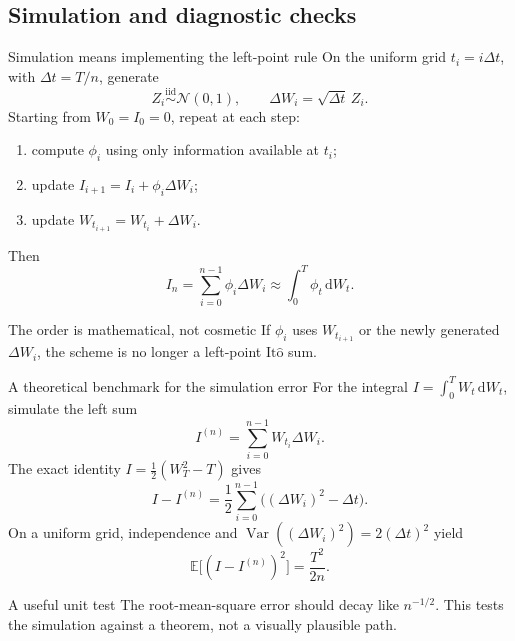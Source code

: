 \documentclass[handout,10pt,aspectratio=169]{beamer}
\newcommand{\E}{\mathbb E}
\newcommand{\dd}{\,\mathrm d}
\newcommand{\Ito}{\mathrm{It\hat{o}}}
\DeclareMathOperator{\Var}{Var}
\begin{document}
\subsection{Simulation and diagnostic checks}

\begin{frame}{Simulation means implementing the left-point rule}
\small
On the uniform grid \(t_i=i\Delta t\), with \(\Delta t=T/n\), generate
\[
Z_i\overset{\mathrm{iid}}{\sim}\mathcal N(0,1),
\qquad
\Delta W_i=\sqrt{\Delta t}\,Z_i.
\]
Starting from \(W_0=I_0=0\), repeat at each step:
\begin{enumerate}\setlength{\itemsep}{0.45em}
  \item compute \(\phi_i\) using only information available at \(t_i\);
  \item update \(I_{i+1}=I_i+\phi_i\Delta W_i\);
  \item update \(W_{t_{i+1}}=W_{t_i}+\Delta W_i\).
\end{enumerate}
Then
\[
I_n=\sum_{i=0}^{n-1}\phi_i\Delta W_i
\approx \int_0^T\phi_t\dd W_t.
\]
\begin{block}{The order is mathematical, not cosmetic}
If \(\phi_i\) uses \(W_{t_{i+1}}\) or the newly generated \(\Delta W_i\), the scheme is no longer a left-point \(\Ito\) sum.
\end{block}
\end{frame}

\begin{frame}{A theoretical benchmark for the simulation error}
\footnotesize
For the integral \(I=\int_0^T W_t\dd W_t\), simulate the left sum
\[
I^{(n)}=\sum_{i=0}^{n-1}W_{t_i}\Delta W_i.
\]
The exact identity \(I=\tfrac12(W_T^2-T)\) gives
\[
I-I^{(n)}
=\frac12\sum_{i=0}^{n-1}\bigl((\Delta W_i)^2-\Delta t\bigr).
\]
On a uniform grid, independence and
\(\Var((\Delta W_i)^2)=2(\Delta t)^2\) yield
\[
\boxed{\E\bigl[(I-I^{(n)})^2\bigr]=\frac{T^2}{2n}.}
\]
\begin{block}{A useful unit test}
The root-mean-square error should decay like \(n^{-1/2}\). This tests the simulation against a theorem, not a visually plausible path.
\end{block}
\end{frame}
\end{document}
